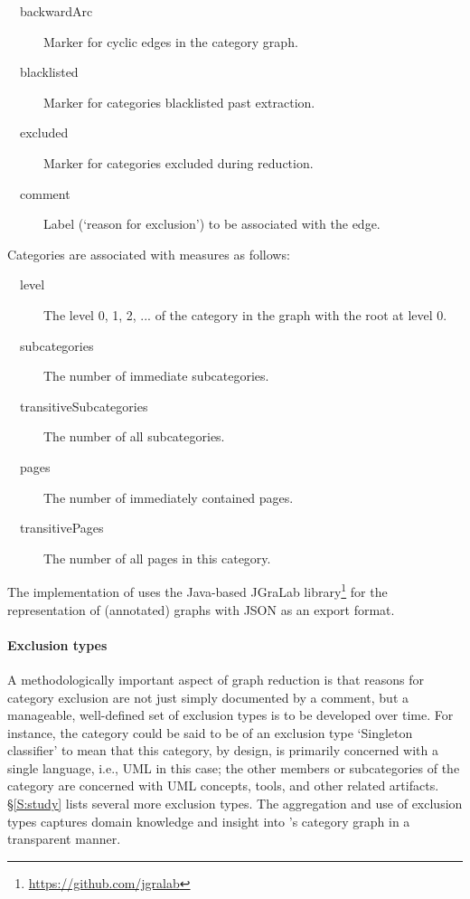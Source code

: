 \vspace{-27\in}

{\small

\begin{description}
\item[\ \ backwardArc] Marker for cyclic edges in the category graph.
\item[\ \ blacklisted] Marker for categories blacklisted past extraction.
\item[\ \ excluded] Marker for categories excluded during reduction.
\item[\ \ comment] Label (`reason for exclusion') to be associated with the edge.
\end{description}

}

\noindent
Categories are associated with measures as follows:

\vspace{-27\in}

{\small

\begin{description}
\item[\ \ level] The level 0, 1, 2, ... of the category in the graph with the root at level 0.
\item[\ \ subcategories] The number of immediate subcategories.
\item[\ \ transitiveSubcategories] The number of all subcategories.
\item[\ \ pages] The number of immediately contained pages.
\item[\ \ transitivePages] The number of all pages in this category.
\end{description}

}

\noindent
The implementation of \WikiTax{} uses the Java-based JGraLab
library\footnote{\url{https://github.com/jgralab}} for the
  representation of (annotated) graphs with JSON as an export format.


\vspace{-27\in}

\paragraph*{\textbf{Exclusion types}} A methodologically important
aspect of graph reduction is that reasons for category exclusion are
not just simply documented by a comment, but a manageable,
well-defined set of exclusion types is to be developed over time. For
instance, the category 
could be said to be of an exclusion type `Singleton classifier' to
mean that this category, by design, is primarily concerned with a
single language, i.e., UML in this case; the other members or
subcategories of the category are concerned with UML concepts, tools,
and other related artifacts. \S\ref{S:study} lists several more
exclusion types. The aggregation and use of exclusion types captures
domain knowledge and insight into \Wikipedia's category graph in a
transparent manner.

